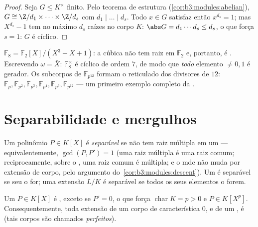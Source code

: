 \begin{proof}
Seja $G \leq K^\times$ finito. Pelo teorema de estrutura (\cref{cor:b3:modules:abelian}), $G \cong \Z/d_1 \times \dots
\times \Z/d_s$
com $d_1 \mid \dots \mid d_s$. Todo $x \in G$ satisfaz então $x^{d_s} = 1$; mas $X^{d_s} - 1$ tem no máximo
$d_s$ raízes no corpo $K$: $\abs G = d_1\cdots d_s \leq d_s$, o que força $s = 1$:
$G$ é cíclico.
\end{proof}

\begin{example}\label{ex:b3:galois:f8}
$\mathbb F_8 = \mathbb F_2[X]/(X^3 + X + 1)$: a cúbica não tem raiz em $\mathbb F_2$ e, portanto, é .
Escrevendo $\omega =
\bar X$: $\mathbb F_8^\times$ é cíclico de ordem $7$, de modo que
\emph{todo} elemento $\neq 0, 1$ é gerador. Os subcorpos de $\mathbb F_{p^{12}}$ formam o
reticulado dos divisores de $12$: $\mathbb F_p, \mathbb F_{p^2}, \mathbb F_{p^3}, \mathbb F_{p^4},
\mathbb F_{p^6}, \mathbb F_{p^{12}}$ --- um primeiro exemplo
completo da .
\end{example}

\section{Separabilidade e mergulhos}

\begin{definition}\label{def:b3:galois:separable}
Um polinômio $P \in K[X]$ é \emph{separável} se não
tem raiz múltipla em um  --- equivalentemente,
$\gcd(P, P') = 1$ (uma raiz múltipla é uma raiz comum; reciprocamente, sobre o
, uma raiz comum é múltipla; e o mdc não muda por
extensão de corpo, pelo argumento do~\cref{cor:b3:modules:descent}). Um  é separável se seu  o for; uma extensão
$L/K$ é separável se todos os seus elementos o forem.
\end{definition}

\begin{proposition}\label{prop:b3:galois:perfect}
Um $P \in K[X]$ \emph{} é , exceto se $P' = 0$, o que
força $\operatorname{char} K = p > 0$ e $P \in K[X^p]$. Consequentemente, toda extensão  de um
corpo de característica $0$, e de um , é 
(tais corpos são chamados \emph{perfeitos}).
\end{proposition}

